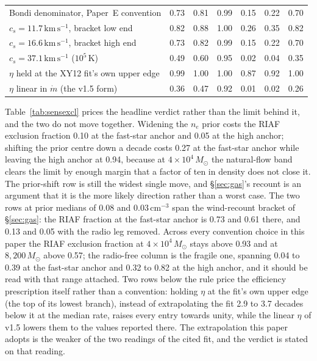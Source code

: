 \documentclass[11pt]{article}
\newcommand{\msun}{\ensuremath{M_\odot}}
\begin{document}
\begin{table}[tbp]
\begin{tabular}{lcccccc}
Bondi denominator, Paper~E convention & 0.73 & 0.81 & 0.99 & 0.15 & 0.22 & 0.70 \\
$c_{s} = 11.7\,\mathrm{km\,s^{-1}}$, bracket low end & 0.82 & 0.88 & 1.00 & 0.26 & 0.35 & 0.82 \\
$c_{s} = 16.6\,\mathrm{km\,s^{-1}}$, bracket high end & 0.73 & 0.82 & 0.99 & 0.15 & 0.22 & 0.70 \\
$c_{s} = 37.1\,\mathrm{km\,s^{-1}}$ ($10^{5}$\,K) & 0.49 & 0.60 & 0.95 & 0.02 & 0.04 & 0.35 \\
\midrule
$\eta$ held at the XY12 fit's own upper edge & 0.99 & 1.00 & 1.00 & 0.87 & 0.92 & 1.00 \\
$\eta$ linear in $\dot{m}$ (the v1.5 form) & 0.36 & 0.47 & 0.92 & 0.01 & 0.02 & 0.26 \\
\bottomrule
\end{tabular}
\end{table}

Table~\ref{tab:sensexcl} prices the headline verdict rather than the limit
behind it, and the two do not move together. Widening the $n_{e}$ prior costs the RIAF exclusion fraction 0.10
at the fast-star anchor and 0.05 at the high anchor; shifting the prior centre
down a decade costs 0.27 at the fast-star anchor while leaving the high anchor
at 0.94, because at $4\times10^{4}\,\msun$ the natural-flow band clears the
limit by enough margin that a factor of ten in density does not close it. The
prior-shift row is still the widest single move, and \S\ref{sec:gas}'s recount
is an argument that it is the more likely direction rather than a worst case.
The two rows at prior medians of 0.08 and 0.03\,$\mathrm{cm^{-3}}$ span the wind-recount bracket
of \S\ref{sec:gas}: the RIAF fraction at the fast-star anchor is 0.73 and 0.61 there,
and 0.13 and 0.05 with the radio leg removed.
Across every convention choice in this paper the RIAF exclusion fraction at
$4\times10^{4}\,\msun$ stays above 0.93 and at $8{,}200\,\msun$ above 0.57;
the radio-free column is the fragile one, spanning 0.04 to 0.39 at the
fast-star anchor and 0.32 to 0.82 at the high anchor, and it should be read
with that range attached. Two rows below the rule price the efficiency
prescription itself rather than a convention: holding $\eta$ at the fit's own upper edge
(the top of its lowest branch), instead of extrapolating the fit
2.9 to 3.7 decades below it at the median rate, raises every entry towards unity, while the
linear $\eta$ of v1.5 lowers them to the values reported there. The extrapolation this paper adopts is the weaker of the two
readings of the cited fit, and the verdict is stated on that reading.
\end{document}
